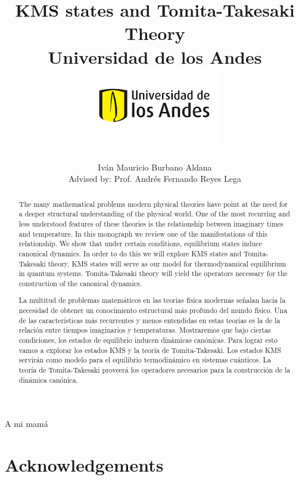 \documentclass[12pt]{report}
\title 
{
	{KMS states and Tomita-Takesaki Theory}\\
	{\large Universidad de los Andes}\\
	{\includegraphics{logo.png}}	
}
\author{Iván Mauricio Burbano Aldana\\[1cm]{\small Advised by: Prof. Andrés Fernando Reyes Lega}}
\newenvironment{dedication}
  {\clearpage           %
   \thispagestyle{empty}%
   \vspace*{\stretch{1}}%
   \itshape             %
   \raggedleft          %
  }
  {\par %
   \vspace{\stretch{3}} %
   \clearpage           %
  }
\theoremstyle{definition}
\begin{document}

\maketitle

\begin{dedication}
{\Large A mi mamá}
\end{dedication}

\begin{abstract}

The many mathematical problems modern physical theories have point at the need for a deeper structural understanding of the physical world. One of the most recurring and less understood features of these theories is the relationship between imaginary times and temperature. In this monograph we review one of the manifestations of this relationship. We show that under certain conditions, equilibrium states induce canonical dynamics. In order to do this we will explore KMS states and Tomita-Takesaki theory. KMS states will serve as our model for thermodynamical equilibrium in quantum systems. Tomita-Takesaki theory will yield the operators necessary for the construction of the canonical dynamics.

\end{abstract}

\begin{otherlanguage}{spanish}
\begin{abstract}

La multitud de problemas matemáticos en las teorías física modernas señalan hacia la necesidad de obtener un conocimiento estructural más profundo del mundo físico. Una de las características más recurrentes y menos entendidas en estas teorías es la de la relación entre tiempos imaginarios y temperaturas. Mostraremos que bajo ciertas condiciones, los estados de equilibrio inducen dinámicas canónicas. Para lograr esto vamos a explorar los estados KMS y la teoría de Tomita-Takesaki. Los estados KMS servirán como modelo para el equilibrio termodinámico en sistemas cuánticos. La teoría de Tomita-Takesaki proveerá los operadores necesarios para la construcción de la dinámica canónica.

\end{abstract}
\end{otherlanguage}

\newpage

\chapter*{Acknowledgements}
\end{document}
